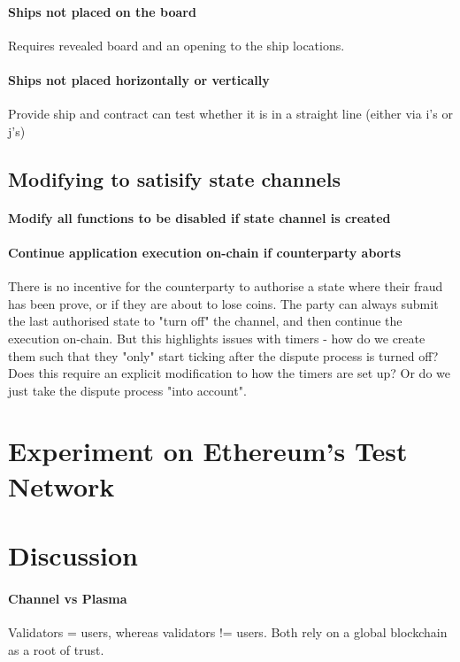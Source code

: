 \documentclass{llncs}
\begin{document}
\paragraph{Ships not placed on the board}
Requires revealed board and an opening to the ship locations. 

\paragraph{Ships not placed horizontally or vertically} 
Provide ship and contract can test whether it is in a straight line (either via i's or j's)

\subsection{Modifying to satisify state channels}

\paragraph{Modify all functions to be disabled if state channel is created}

\paragraph{Continue application execution on-chain if counterparty aborts}
There is no incentive for the counterparty to authorise a state where their fraud has been prove, or if they are about to lose coins. The party can always submit the last authorised state to "turn off" the channel, and then continue the execution on-chain. But this highlights issues with timers - how do we create them such that they "only" start ticking after the dispute process is turned off? Does this require an explicit modification to how the timers are set up? Or do we just take the dispute process "into account". 

\section{Experiment on Ethereum's Test Network}

\section{Discussion} 

\paragraph{Channel vs Plasma} Validators = users, whereas validators != users. Both rely on a global blockchain as a root of trust. 
\end{document}
